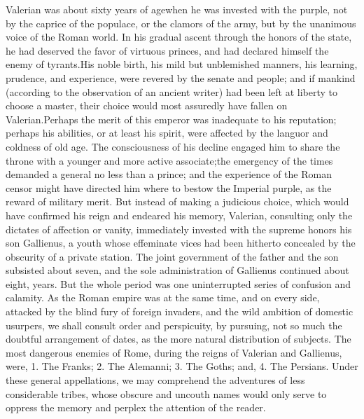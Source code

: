 Valerian was about sixty years of age\footnotemark[63] when he was invested
with the purple, not by the caprice of the populace, or the
clamors of the army, but by the unanimous voice of the Roman
world. In his gradual ascent through the honors of the state, he
had deserved the favor of virtuous princes, and had declared
himself the enemy of tyrants.\footnotemark[64] His noble birth, his mild but
unblemished manners, his learning, prudence, and experience, were
revered by the senate and people; and if mankind (according to
the observation of an ancient writer) had been left at liberty to
choose a master, their choice would most assuredly have fallen on
Valerian.\footnotemark[65] Perhaps the merit of this emperor was inadequate to
his reputation; perhaps his abilities, or at least his spirit,
were affected by the languor and coldness of old age. The
consciousness of his decline engaged him to share the throne with
a younger and more active associate;\footnotemark[66] the emergency of the
times demanded a general no less than a prince; and the
experience of the Roman censor might have directed him where to
bestow the Imperial purple, as the reward of military merit. But
instead of making a judicious choice, which would have confirmed
his reign and endeared his memory, Valerian, consulting only the
dictates of affection or vanity, immediately invested with the
supreme honors his son Gallienus, a youth whose effeminate vices
had been hitherto concealed by the obscurity of a private
station. The joint government of the father and the son subsisted
about seven, and the sole administration of Gallienus continued
about eight, years. But the whole period was one uninterrupted
series of confusion and calamity. As the Roman empire was at the
same time, and on every side, attacked by the blind fury of
foreign invaders, and the wild ambition of domestic usurpers, we
shall consult order and perspicuity, by pursuing, not so much the
doubtful arrangement of dates, as the more natural distribution
of subjects. The most dangerous enemies of Rome, during the
reigns of Valerian and Gallienus, were, 1. The Franks; 2. The
Alemanni; 3. The Goths; and, 4. The Persians. Under these general
appellations, we may comprehend the adventures of less
considerable tribes, whose obscure and uncouth names would only
serve to oppress the memory and perplex the attention of the
reader.


